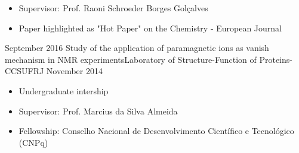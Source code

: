 \begin{experiences}
{\begin{itemize}
                        \item Supervisor: Prof. Raoni Schroeder Borges Golçalves        
                        \item Paper highlighted as "Hot Paper" on the Chemistry - European Journal                                                                                              
                      \end{itemize}
                    }
                    {}
  \emptySeparator
  \experience
    {September 2016} {Study of the application of paramagnetic ions as vanish mechanism in NMR experiments}{Laboratory of Structure-Function of Proteins-CCS}{UFRJ}
    {November 2014}    {
                      \begin{itemize}
                      	\item Undergraduate intership
                        \item Supervisor: Prof. Marcius da Silva Almeida    
                        \item Fellowship: Conselho Nacional de Desenvolvimento Científico e Tecnológico (CNPq)                                                                                 
                      \end{itemize}
                    }
                    {}
 
\end{experiences}
